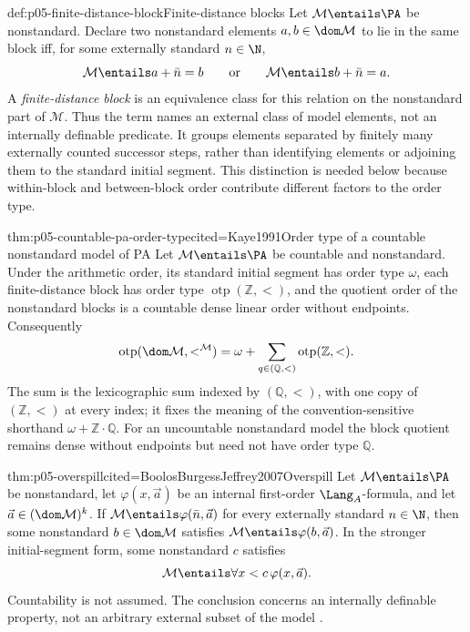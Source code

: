\begin{hbdefinition}{def:p05-finite-distance-block}{Finite-distance blocks}
Let \(\mathcal M\entails\PA\) be nonstandard.  Declare two nonstandard
elements \(a,b\in\dom\mathcal M\) to lie in the same block iff, for some
externally standard \(n\in\N\),
\[
  \mathcal M\entails a+\bar n=b
  \qquad\text{or}\qquad
  \mathcal M\entails b+\bar n=a.
\]
A \emph{finite-distance block} is an equivalence class for this relation on
the nonstandard part of \(\mathcal M\).  Thus the term names an
external class of model elements, not an internally definable predicate.
It groups elements separated by finitely many externally counted successor
steps, rather than identifying elements or adjoining them to the standard
initial segment.  This distinction is needed below because within-block and
between-block order contribute different factors to the order type.
\end{hbdefinition}

\begin{hbtheorem}{thm:p05-countable-pa-order-type}{cited=Kaye1991}{Order type of a countable nonstandard model of PA}
Let \(\mathcal M\entails\PA\) be countable and nonstandard.  Under the
arithmetic order, its standard initial segment has order type \(\omega\),
each finite-distance block has order type
\(\operatorname{otp}(\mathbb Z,<)\), and the quotient order of the nonstandard
blocks is a countable dense linear order without endpoints.  Consequently
\[
  \operatorname{otp}(\dom\mathcal M,<^{\mathcal M})
  =\omega+\sum_{q\in(\mathbb Q,<)}\operatorname{otp}(\mathbb Z,<).
\]
The sum is the lexicographic sum indexed by \((\mathbb Q,<)\), with one copy of
\((\mathbb Z,<)\) at every index; it fixes the meaning of the
convention-sensitive shorthand \(\omega+\mathbb Z\cdot\mathbb Q\).  For an
uncountable nonstandard model the
block quotient remains dense without endpoints but need not have order
type \(\mathbb Q\).
\end{hbtheorem}

\begin{hbtheorem}{thm:p05-overspill}{cited=BoolosBurgessJeffrey2007}{Overspill}
Let \(\mathcal M\entails\PA\) be nonstandard, let
\(\varphi(x,\vec a)\) be an internal first-order \(\Lang_A\)-formula,
and let \(\vec a\in(\dom\mathcal M)^k\).  If
\(\mathcal M\entails\varphi(\bar n,\vec a)\) for every externally
standard \(n\in\N\), then some nonstandard \(b\in\dom\mathcal M\)
satisfies \(\mathcal M\entails\varphi(b,\vec a)\).  In the stronger
initial-segment form, some nonstandard \(c\) satisfies
\[
  \mathcal M\entails\forall x<c\,\varphi(x,\vec a).
\]
Countability is not assumed.  The conclusion concerns an internally
definable property, not an arbitrary external subset of the model
\cite{Kaye1991}.
\end{hbtheorem}


